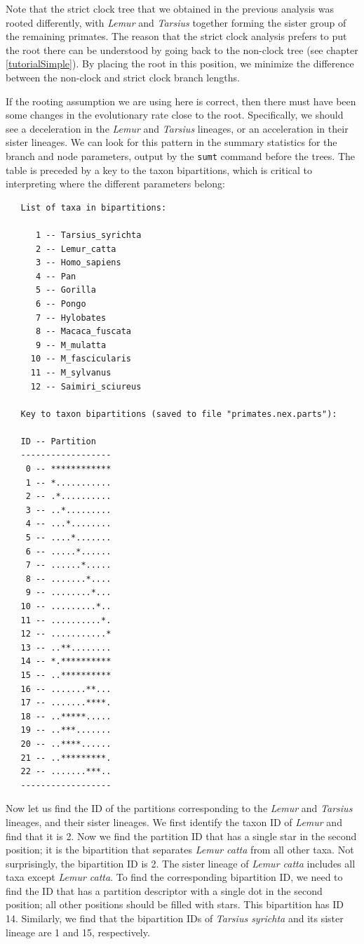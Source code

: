\documentclass[12pt]{book}
\newcommand{\ttt}[1]{\texttt{#1}}
\begin{document}
Note that the strict clock tree that we obtained in the previous analysis was rooted differently,
with \textit{Lemur} and \textit{Tarsius} together forming the sister group of the remaining
primates. The reason that the strict clock analysis prefers to put the root there can be understood
by going back to the non-clock tree (see chapter \ref{tutorialSimple}). By placing the root in this
position, we minimize the difference between the non-clock and strict clock branch lengths.

If the rooting assumption we are using here is correct, then there must have been some changes in
the evolutionary rate close to the root. Specifically, we should see a deceleration in the
\textit{Lemur} and \textit{Tarsius} lineages, or an acceleration in their sister lineages. We can
look for this pattern in the summary statistics for the branch and node parameters, output by the
\ttt{sumt} command before the trees. The table is preceded by a key to the taxon bipartitions,
which is critical to interpreting where the different parameters belong:

\begin{singlespacing}
\begin{verbatim}
   List of taxa in bipartitions:

      1 -- Tarsius_syrichta
      2 -- Lemur_catta
      3 -- Homo_sapiens
      4 -- Pan
      5 -- Gorilla
      6 -- Pongo
      7 -- Hylobates
      8 -- Macaca_fuscata
      9 -- M_mulatta
     10 -- M_fascicularis
     11 -- M_sylvanus
     12 -- Saimiri_sciureus

   Key to taxon bipartitions (saved to file "primates.nex.parts"):

   ID -- Partition
   ------------------
    0 -- ************
    1 -- *...........
    2 -- .*..........
    3 -- ..*.........
    4 -- ...*........
    5 -- ....*.......
    6 -- .....*......
    7 -- ......*.....
    8 -- .......*....
    9 -- ........*...
   10 -- .........*..
   11 -- ..........*.
   12 -- ...........*
   13 -- ..**........
   14 -- *.**********
   15 -- ..**********
   16 -- .......**...
   17 -- .......****.
   18 -- ..*****.....
   19 -- ..***.......
   20 -- ..****......
   21 -- ..*********.
   22 -- .......***..
   ------------------
\end{verbatim}
\end{singlespacing}

Now let us find the ID of the partitions corresponding to the \textit{Lemur} and \textit{Tarsius}
lineages, and their sister lineages. We first identify the taxon ID of \textit{Lemur} and find that
it is 2. Now we find the partition ID that has a single star in the second position; it is the
bipartition that separates \textit{Lemur catta} from all other taxa. Not surprisingly, the
bipartition ID is 2. The sister lineage of \textit{Lemur catta} includes all taxa except
\textit{Lemur catta}. To find the corresponding bipartition ID, we need to find the ID that has a
partition descriptor with a single dot in the second position; all other positions should be filled
with stars. This bipartition has ID 14. Similarly, we find that the bipartition IDs of
\textit{Tarsius syrichta} and its sister lineage are 1 and 15, respectively.
\end{document}
